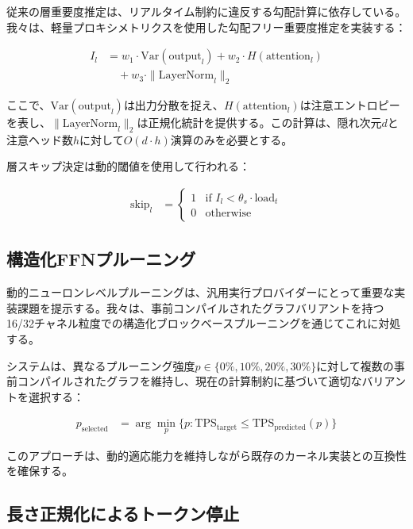 \documentclass[10pt,twocolumn,a4paper]{jarticle}
\begin{document}
従来の層重要度推定は、リアルタイム制約に違反する勾配計算に依存している。我々は、軽量プロキシメトリクスを使用した勾配フリー重要度推定を実装する：

\begin{align}
I_l &= w_1 \cdot \text{Var}(\text{output}_l) + w_2 \cdot H(\text{attention}_l) \nonumber \\
&\quad + w_3 \cdot \|\text{LayerNorm}_l\|_2 \label{eq:importance}
\end{align}

ここで、$\text{Var}(\text{output}_l)$は出力分散を捉え、$H(\text{attention}_l)$は注意エントロピーを表し、$\|\text{LayerNorm}_l\|_2$は正規化統計を提供する。この計算は、隠れ次元$d$と注意ヘッド数$h$に対して$O(d \cdot h)$演算のみを必要とする。

層スキップ決定は動的閾値を使用して行われる：

\begin{align}
\text{skip}_l &= \begin{cases}
1 & \text{if } I_l < \theta_s \cdot \text{load}_t \\
0 & \text{otherwise}
\end{cases} \label{eq:layer_skip}
\end{align}

\subsection{構造化FFNプルーニング}

動的ニューロンレベルプルーニングは、汎用実行プロバイダーにとって重要な実装課題を提示する。我々は、事前コンパイルされたグラフバリアントを持つ16/32チャネル粒度での構造化ブロックベースプルーニングを通じてこれに対処する。

システムは、異なるプルーニング強度$p \in \{0\%, 10\%, 20\%, 30\%\}$に対して複数の事前コンパイルされたグラフを維持し、現在の計算制約に基づいて適切なバリアントを選択する：

\begin{align}
p_{\text{selected}} &= \arg\min_{p} \{p : \text{TPS}_{\text{target}} \leq \text{TPS}_{\text{predicted}}(p)\} \label{eq:ffn_selection}
\end{align}

このアプローチは、動的適応能力を維持しながら既存のカーネル実装との互換性を確保する。

\subsection{長さ正規化によるトークン停止}
\end{document}
